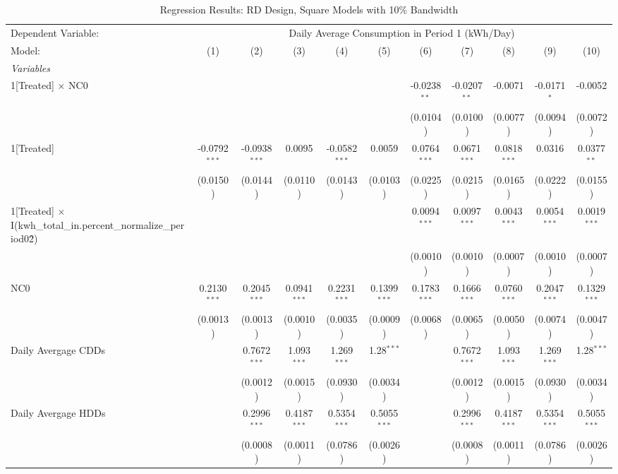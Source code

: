 \begin{table}[htbp]
\centering
\caption{\label{Table:Regression-Results_RD_Square_BW-10} Regression Results: RD Design, Square Models with 10\% Bandwidth}
\begin{tabular}{lcccccccccc}
\tabularnewline\toprule\toprule
Dependent Variable:&\multicolumn{10}{c}{Daily Average Consumption in Period 1 (kWh/Day)}\\
Model:&(1) & (2) & (3) & (4) & (5) & (6) & (7) & (8) & (9) & (10)\\
\midrule
\emph{Variables}&   &   &   &   &   &   &   &   &   &  \\
1[Treated] $\times $ NC0&   &    &    &    &    & -0.0238$^{**}$ & -0.0207$^{**}$ & -0.0071 & -0.0171$^{*}$ & -0.0052\\
  &   &    &    &    &    & (0.0104) & (0.0100) & (0.0077) & (0.0094) & (0.0072)\\
1[Treated]&-0.0792$^{***}$ & -0.0938$^{***}$ & 0.0095 & -0.0582$^{***}$ & 0.0059 & 0.0764$^{***}$ & 0.0671$^{***}$ & 0.0818$^{***}$ & 0.0316 & 0.0377$^{**}$\\
  &(0.0150) & (0.0144) & (0.0110) & (0.0143) & (0.0103) & (0.0225) & (0.0215) & (0.0165) & (0.0222) & (0.0155)\\
1[Treated] $\times $ I(kwh\_total\_in.percent\_normalize\_period0\^2)&   &    &    &    &    & 0.0094$^{***}$ & 0.0097$^{***}$ & 0.0043$^{***}$ & 0.0054$^{***}$ & 0.0019$^{***}$\\
  &   &    &    &    &    & (0.0010) & (0.0010) & (0.0007) & (0.0010) & (0.0007)\\
NC0&0.2130$^{***}$ & 0.2045$^{***}$ & 0.0941$^{***}$ & 0.2231$^{***}$ & 0.1399$^{***}$ & 0.1783$^{***}$ & 0.1666$^{***}$ & 0.0760$^{***}$ & 0.2047$^{***}$ & 0.1329$^{***}$\\
  &(0.0013) & (0.0013) & (0.0010) & (0.0035) & (0.0009) & (0.0068) & (0.0065) & (0.0050) & (0.0074) & (0.0047)\\
Daily Avergage CDDs&   & 0.7672$^{***}$ & 1.093$^{***}$ & 1.269$^{***}$ & 1.28$^{***}$ &    & 0.7672$^{***}$ & 1.093$^{***}$ & 1.269$^{***}$ & 1.28$^{***}$\\
  &   & (0.0012) & (0.0015) & (0.0930) & (0.0034) &    & (0.0012) & (0.0015) & (0.0930) & (0.0034)\\
Daily Avergage HDDs&   & 0.2996$^{***}$ & 0.4187$^{***}$ & 0.5354$^{***}$ & 0.5055$^{***}$ &    & 0.2996$^{***}$ & 0.4187$^{***}$ & 0.5354$^{***}$ & 0.5055$^{***}$\\
  &   & (0.0008) & (0.0011) & (0.0786) & (0.0026) &    & (0.0008) & (0.0011) & (0.0786) & (0.0026)\\

\end{tabular}
\end{table}
